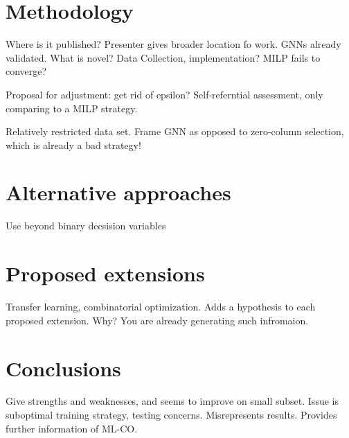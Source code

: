 \documentclass[10pt, oneside]{article}
\begin{document}
\section{Methodology}
Where is it published? Presenter gives broader location fo work.
GNNs already validated. What is novel? Data Collection, implementation? MILP fails to converge?

Proposal for adjustment: get rid of epsilon?
Self-referntial assessment, only comparing to a MILP strategy. 

Relatively restricted data set. Frame GNN as opposed to zero-column selection, which is already a bad strategy! 

\section{Alternative approaches}
Use beyond binary decsision variables
\section{Proposed extensions}
Transfer learning, combinatorial optimization. Adds a hypothesis to each proposed extension. Why? You are already generating such infromaion. 

\section{Conclusions}
Give strengths and weaknesses, and seems to improve on small subset. Issue is suboptimal training strategy, testing concerns. Misrepresents results. Provides further information of ML-CO. 
\end{document}
